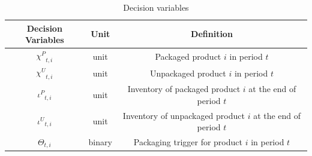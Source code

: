 \documentclass[a4paper,12pt]{article}
\begin{document}
\begin{table}[H]
\centering
\begin{tabular}{|c|c|c|}
\hline
\textbf{Decision Variables} & \textbf{Unit} & \textbf{Definition} \\
\hline 
 ${\chi ^P}_{t, i}$    & unit & Packaged product $i$ in period $t$ \\
\hline
 ${\chi ^U}_{t, i}$    & unit & Unpackaged product $i$ in period $t$ \\
 \hline
 ${\iota ^P}_{t, i}$    & unit & Inventory of packaged product $i$ at the end of period $t$ \\
\hline
 ${\iota ^U}_{t, i}$    & unit & Inventory of unpackaged product $i$ at the end of period $t$ \\
\hline
 $\Theta_{t, i}$    & binary & Packaging trigger for product $i$ in period $t$ \\
\hline
\end{tabular}
\caption{Decision variables}
\label{tab:decision_variables}
\end{table}
\end{document}

